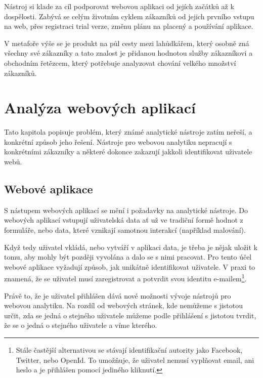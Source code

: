 \documentclass[bc,male,java,dept456]{diploma}						%
\begin{document}
Nástroj si klade za cíl podporovat webovou aplikaci od jejích začátků až k dospělosti. Zabývá se celým životním cyklem zákazníků od jejich prvního vstupu na web, přes registraci trial verze, změnu plánu na placený a používání aplikace.

V metafoře výše se je produkt na půl cesty mezi lahůdkářem, který osobně zná všechny své zákazníky a tato znalost je přidanou hodnotou služby zákazníkovi a obchodním řetězcem, který potřebuje analyzovat chování velkého množství zákazníků.









\section{Analýza webových aplikací}

Tato kapitola popisuje problém, který známé analytické nástroje zatím neřeší, a konkrétní způsob jeho řešení. Nástroje pro webovou analytiku nepracují s konkrétními zákazníky a některé dokonce zakazují jakkoli identifikovat uživatele webů.



\subsection{Webové aplikace}

S nástupem webových aplikací se mění i požadavky na analytické nástroje. Do webových aplikací vstupují uživatelská data ať už ve tradiční formě hodnot z formuláře, nebo data, které vznikají samotnou interakcí (například  malování). 

Když tedy uživatel vkládá, nebo vytváří v aplikaci data, je třeba je nějak uložit k tomu, aby mohly být později vyvolána a dalo se s nimi pracovat. Pro tento účel webové aplikace vyžadují způsob, jak unikátně identifikovat uživatele. V praxi to znamená, že se uživatel musí zaregistrovat a potvrdit svou identitu e-mailem\footnote{Stále častější alternativou se stávají identifikační autority jako Facebook, Twitter, nebo OpenId. To umožňuje, že uživatel nemusí vyplňovat email, ani heslo a je přihlášen pomocí jediného kliknutí.}.

Právě to, že je uživatel přihlášen dává nové možnosti vývoje nástrojů pro webovou analytiku. Na rozdíl od webových stránek, kde nemůžeme s jistotou určit, zda se jedná o stejného uživatele můžeme podle přihlášení s jistotou tvrdit, že se o jedná o stejného uživatele a víme kterého.
\end{document}
